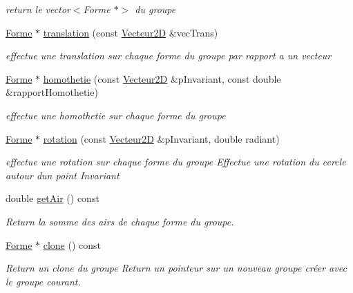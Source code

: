 \begin{DoxyCompactItemize}
\begin{DoxyCompactList}\small\item\em return le vector$<$\+Forme $\ast$$>$ du groupe \end{DoxyCompactList}\item 
\mbox{\hyperlink{class_forme}{Forme}} $\ast$ \mbox{\hyperlink{class_groupe_af4708ce13fbcc867aec3f027663f676c}{translation}} (const \mbox{\hyperlink{class_vecteur2_d}{Vecteur2D}} \&vec\+Trans)
\begin{DoxyCompactList}\small\item\em effectue une translation sur chaque forme du groupe par rapport a un vecteur \end{DoxyCompactList}\item 
\mbox{\hyperlink{class_forme}{Forme}} $\ast$ \mbox{\hyperlink{class_groupe_a88053e52f4144d3938aa2c656ddd6395}{homothetie}} (const \mbox{\hyperlink{class_vecteur2_d}{Vecteur2D}} \&p\+Invariant, const double \&rapport\+Homothetie)
\begin{DoxyCompactList}\small\item\em effectue une homothetie sur chaque forme du groupe \end{DoxyCompactList}\item 
\mbox{\hyperlink{class_forme}{Forme}} $\ast$ \mbox{\hyperlink{class_groupe_a63a6fa7250c34731dc8166640b223de1}{rotation}} (const \mbox{\hyperlink{class_vecteur2_d}{Vecteur2D}} \&p\+Invariant, double radiant)
\begin{DoxyCompactList}\small\item\em effectue une rotation sur chaque forme du groupe Effectue une rotation du cercle autour d\textquotesingle{}un point Invariant \end{DoxyCompactList}\item 
double \mbox{\hyperlink{class_groupe_ac002fde356ceb23ad7464cb802191765}{get\+Air}} () const
\begin{DoxyCompactList}\small\item\em Return la somme des airs de chaque forme du groupe. \end{DoxyCompactList}\item 
\mbox{\hyperlink{class_forme}{Forme}} $\ast$ \mbox{\hyperlink{class_groupe_a614513db9e80b6e6c0811da16d89bb19}{clone}} () const
\begin{DoxyCompactList}\small\item\em Return un clone du groupe Return un pointeur sur un nouveau groupe créer avec le groupe courant. \end{DoxyCompactList}\item 

\end{DoxyCompactItemize}
